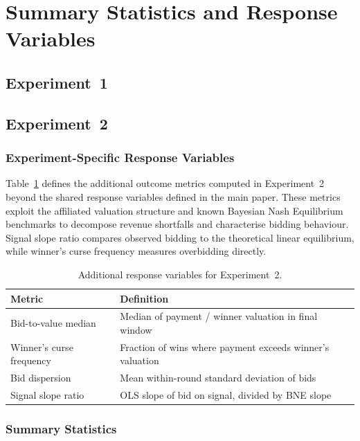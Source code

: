 \section{Summary Statistics and Response Variables}
\label{sec:appendix_summary}

\subsection{Experiment~1}



\subsection{Experiment~2}

\subsubsection{Experiment-Specific Response Variables}

Table~\ref{tab:exp2_responses} defines the additional outcome metrics computed in Experiment~2 beyond the shared response variables defined in the main paper. These metrics exploit the affiliated valuation structure and known Bayesian Nash Equilibrium benchmarks to decompose revenue shortfalls and characterise bidding behaviour. Signal slope ratio compares observed bidding to the theoretical linear equilibrium, while winner's curse frequency measures overbidding directly.

\begin{table}[H]
\centering
\caption{Additional response variables for Experiment~2.}
\label{tab:exp2_responses}
\begin{tabular}{l l}
\toprule
\textbf{Metric} & \textbf{Definition} \\
\midrule
Bid-to-value median & Median of payment / winner valuation in final window \\
Winner's curse frequency & Fraction of wins where payment exceeds winner's valuation \\
Bid dispersion & Mean within-round standard deviation of bids \\
Signal slope ratio & OLS slope of bid on signal, divided by BNE slope \\
\bottomrule
\end{tabular}
\end{table}

\subsubsection{Summary Statistics}

